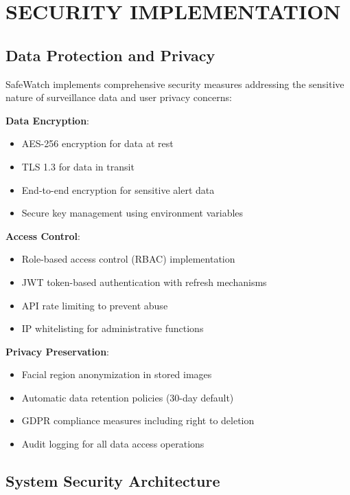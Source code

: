 \documentclass[12pt,a4paper]{article}
\begin{document}
\newpage
\section{SECURITY IMPLEMENTATION}

\subsection{Data Protection and Privacy}

SafeWatch implements comprehensive security measures addressing the sensitive nature of surveillance data and user privacy concerns:

\textbf{Data Encryption}:
\begin{itemize}
    \item AES-256 encryption for data at rest
    \item TLS 1.3 for data in transit
    \item End-to-end encryption for sensitive alert data
    \item Secure key management using environment variables
\end{itemize}

\textbf{Access Control}:
\begin{itemize}
    \item Role-based access control (RBAC) implementation
    \item JWT token-based authentication with refresh mechanisms
    \item API rate limiting to prevent abuse
    \item IP whitelisting for administrative functions
\end{itemize}

\textbf{Privacy Preservation}:
\begin{itemize}
    \item Facial region anonymization in stored images
    \item Automatic data retention policies (30-day default)
    \item GDPR compliance measures including right to deletion
    \item Audit logging for all data access operations
\end{itemize}

\subsection{System Security Architecture}
\end{document}
